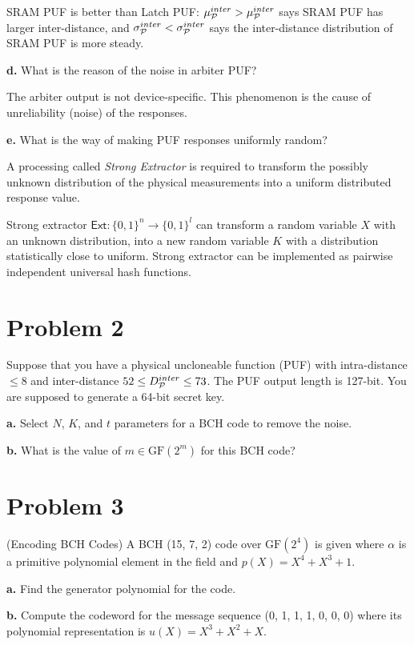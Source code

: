 \documentclass[12pt]{article}
\theoremstyle{plain}
\begin{document}
\Sol SRAM PUF is better than Latch PUF: $\mu_{\mathcal{P}}^{inter} > \mu_{\mathcal{P}}^{inter}$ says SRAM PUF has larger inter-distance, and $\sigma_{\mathcal{P}}^{inter} < \sigma_{\mathcal{P}}^{inter}$ says the inter-distance distribution of SRAM PUF is more steady.


{\bf d.} What is the reason of the noise in arbiter PUF?

\Sol The arbiter output is not device-specific. This
phenomenon is the cause of unreliability (noise) of the responses.

{\bf e.} What is the way of making PUF responses uniformly random?

\Sol A processing called \emph{Strong Extractor} is required to transform the possibly unknown distribution of
the physical measurements into a uniform distributed response value.

Strong extractor $\textsf{Ext} : \{0,1\}^n \to \{0,1\}^l$ can transform a random variable $X$ with an unknown distribution, into a new random variable $K$ with a distribution statistically close to uniform.
Strong extractor can be implemented as pairwise independent universal hash functions.

\section{Problem 2}
Suppose that you have a physical uncloneable function (PUF) with
intra-distance $\leq 8$ and inter-distance $52 \leq D_{\mathcal{P}}^{inter} \leq 73$. The PUF
output length is 127-bit. You are supposed to generate a 64-bit secret
key.

{\bf a.} Select $N$, $K$, and $t$ parameters for a BCH code to remove the noise.

\Sol 

\newcommand{\GF}{\textrm{GF}}
{\bf b.} What is the value of $m \in \GF(2^m)$ for this BCH code?

\Sol 

\section{Problem 3}

(Encoding BCH Codes) A BCH (15, 7, 2) code over $\GF(2^4)$ is given where $\alpha$ is a primitive polynomial element in the field and $p(X) = X^4 + X^3 + 1$.

{\bf a.} Find the generator polynomial for the code.

\Sol 

{\bf b.} Compute the codeword for the message sequence (0, 1, 1, 1, 0, 0, 0)
where its polynomial representation is $u(X) = X^3 + X^2 + X$.

\Sol 
\end{document}
